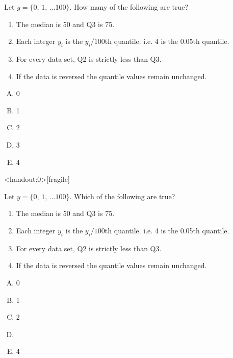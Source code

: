 \documentclass[xcolor=svgnames, 10pt]{beamer}
\begin{document}
\begin{frame}[fragile]
\begin{question}
Let $y = \{0,\,1,\, \ldots 100\}$.  How many of the following are true?
\begin{enumerate}
\item The median is 50 and Q3 is 75. 
\item Each integer $y_i$ is the $y_i/100$th quantile.  i.e. 4 is the 0.05th quantile. 
\item For every data set, Q2 is strictly less than Q3. 
\item If the data is reversed the quantile values remain unchanged. 
\end{enumerate}
\begin{multicols}{5}
\begin{enumerate}[A)]
\item 0
\item 1
\item 2
\item 3
\item 4
\end{enumerate}
\end{multicols}
\end{question}
\end{frame}


\begin{frame}<handout:0>[fragile]
\begin{question}
Let $y = \{0,\,1,\, \ldots 100\}$.  Which of the following are true?
\begin{enumerate}
\item The median is 50 and Q3 is 75. \onslide<+->{}\pcmark
\item Each integer $y_i$ is the $y_i/100$th quantile.  i.e. 4 is the 0.05th quantile. \pcmark
\item For every data set, Q2 is strictly less than Q3. \pxmark
\vfill
{}
\vfill
\item If the data is reversed the quantile values remain unchanged. \pcmark
\end{enumerate}
\begin{multicols}{5}
\begin{enumerate}[A)]
\item 0
\item 1
\item 2
\item {}
\item 4
\end{enumerate}
\end{multicols}
\end{question}
\end{frame}
\end{document}
